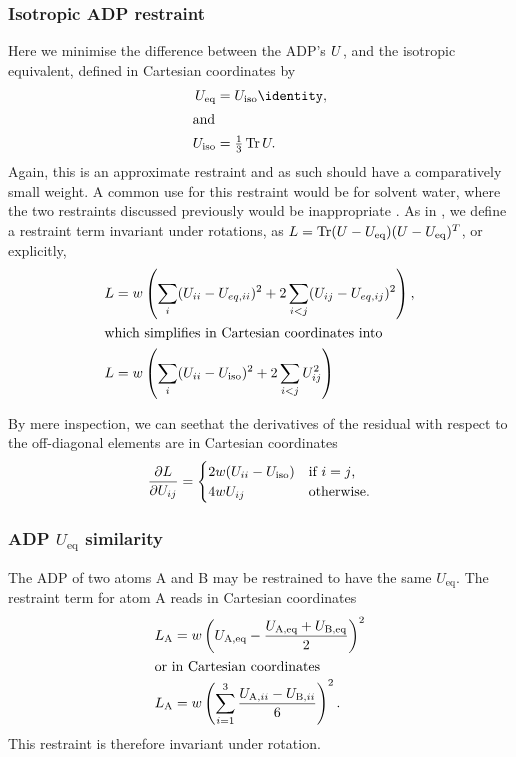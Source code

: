 \documentclass[pdf]{iucr}
\begin{document}
\subsubsection{Isotropic ADP restraint}
Here we minimise the difference between the ADP's $U$, and the isotropic equivalent, defined in Cartesian coordinates by
\begin{align}
\mat{U}_\text{eq} &= U_\text{iso}\identity, \\
\intertext{and}
U_\text{iso} &= \tfrac{1}{3} \tr \mat{U}.
\end{align}
Again, this is an approximate restraint and as such should have a comparatively small weight. A common use for this restraint would be for solvent water, where the two restraints discussed previously would be inappropriate \cite{Sheldrick:1997aa}. As in , we define a restraint term invariant under rotations, as $L = \operatorname{Tr} (U-U_\text{eq})(U-U_\text{eq})^T$, or explicitly,
\begin{align}
\label{eqn:ADP:restraints:isotropic}
L &= w \left( \sum_i (U_{ii} - U_{eq,ii})^2 + 2 \sum_{i<j} (U_{ij}-U_{eq,ij})^2 \right),\\
\intertext{which simplifies in Cartesian coordinates into}
L &= w \left( \sum_i (U_{ii} - U_\text{iso})^2 + 2 \sum_{i<j} U_{ij}^2 \right)
\end{align}

By mere inspection, we can seethat the derivatives of the residual with respect to the off-diagonal elements are in Cartesian coordinates
\begin{equation}
\frac{\partial L}{\partial U_{ij}} = \begin{cases}
 2 w (U_{ii} - U_\text{iso}) & \text{if $i=j$,}\\
 4 w U_{ij} & \text{otherwise}.
 \end{cases}
\end{equation}

\subsubsection{ADP $U_\text{eq}$ similarity}

The ADP of two atoms A and B may be restrained to have the same $U_\text{eq}$. The restraint term for atom A reads in Cartesian coordinates
\begin{align}
L_\text{A} &= w  \left(U_\text{A,eq}-\frac{U_\text{A,eq}+U_\text{B,eq}}{2}\right)^2 \\
\intertext{or in Cartesian coordinates}
L_\text{A} &= w \left( \sum_{i=1}^3 \frac{U_{\text{A},ii} - U_{\text{B},ii}}{6} \right) ^2.
\end{align}
This restraint is therefore invariant under rotation.
\end{document}
